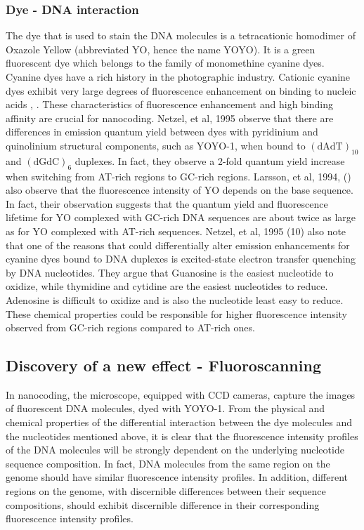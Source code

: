 \subsubsection*{Dye - DNA interaction} 
The dye that is used to stain the DNA molecules is a tetracationic homodimer of Oxazole Yellow (abbreviated YO, hence the name YOYO). It is a green fluorescent dye which belongs to the family of monomethine cyanine dyes. Cyanine dyes have a rich history in the photographic industry. Cationic  cyanine dyes  exhibit very large degrees of fluorescence enhancement on binding to nucleic acids \cite{Rye_etal_1992_NAR}, \cite{Lee_etal_1986_Cytometry}. These  characteristics of fluorescence enhancement and  high binding affinity are crucial for nanocoding. Netzel, et al, 1995 \cite{Netzel_etal_1995_JPC} observe that there are differences in emission quantum yield between dyes with pyridinium and quinolinium structural components, such as YOYO-1, when bound to $(\text{dAdT})_{10}$ and $(\text{dGdC})_6$ duplexes. In fact, they observe a 2-fold quantum yield increase when switching from AT-rich regions to GC-rich regions. Larsson, et al, 1994, (\cite{Larsson_etal_1994_JACS}) also observe that the fluorescence intensity of YO depends on the base sequence. In fact, their observation suggests that the quantum yield and fluorescence lifetime for YO complexed with GC-rich DNA sequences are about twice as large as for YO complexed with AT-rich sequences. Netzel, et al, 1995 (10) also note that one of the reasons that could differentially alter emission enhancements for cyanine dyes bound to DNA  duplexes is excited-state electron transfer quenching by DNA nucleotides. They argue that Guanosine is the easiest nucleotide to oxidize, while thymidine and cytidine are the easiest nucleotides to reduce. Adenosine is difficult to oxidize and is also the nucleotide least easy to reduce. These chemical properties could be responsible for higher fluorescence intensity observed from GC-rich regions compared to AT-rich ones. 

\subsection{Discovery of a new effect - Fluoroscanning}
In nanocoding, the microscope, equipped with CCD cameras, capture the images of fluorescent DNA molecules, dyed with YOYO-1. From the physical and chemical properties of the differential interaction between the dye molecules and the nucleotides mentioned above, it is clear that the fluorescence intensity profiles of the DNA molecules will be strongly dependent on the underlying nucleotide sequence composition. In fact, DNA molecules from the same region on the genome should have similar  fluorescence intensity profiles. In addition, different regions on the genome, with discernible differences between their sequence compositions, should exhibit discernible difference in their corresponding  fluorescence intensity profiles. \\

